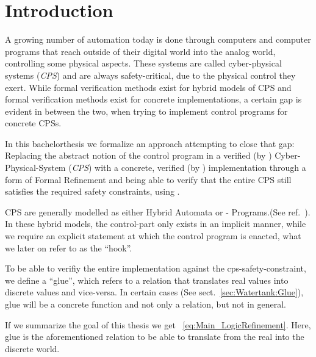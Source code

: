 
\chapter{Introduction}
\label{ch:Introduction}

A growing number of automation today is done through computers and computer programs that reach outside of their digital world into the analog world, controlling some physical aspects. These systems are called cyber-physical systems (\textit{CPS}) and are always safety-critical, due to the physical control they exert. While formal verification methods exist for hybrid models of CPS and formal verification methods exist for concrete implementations, a certain gap is evident in between the two, when trying to implement control programs for concrete CPSs.

In this bachelorthesis we formalize an approach attempting to close that gap: Replacing the abstract notion of the control program in a verified (by \keym) Cyber-Physical-System (\textit{CPS}) with a concrete, verified (by \key) implementation through a form of Formal Refinement and being able to verify that the entire CPS still satisfies the required safety constraints, using \keym. 

CPS are generally modelled as either Hybrid Automata or - Programs.(See ref.~\cite{platzer2010b}). In these hybrid models, the control-part only exists in an implicit manner, while we require an explicit statement at which the control program is enacted, what we later on refer to as the ``hook''.  

To be able to verifiy the entire implementation against the cps-safety-constraint, we define a ``glue'', which refers to a relation that translates real values into discrete values and vice-versa. In certain cases (See sect.~\ref{sec:Watertank:Glue}), glue will be a concrete function and not only a relation, but not in general.

If we summarize the goal of this thesis we get ~\ref{eq:Main_LogicRefinement}. Here, glue is the aforementioned relation to be able to translate from the real into the discrete world.


